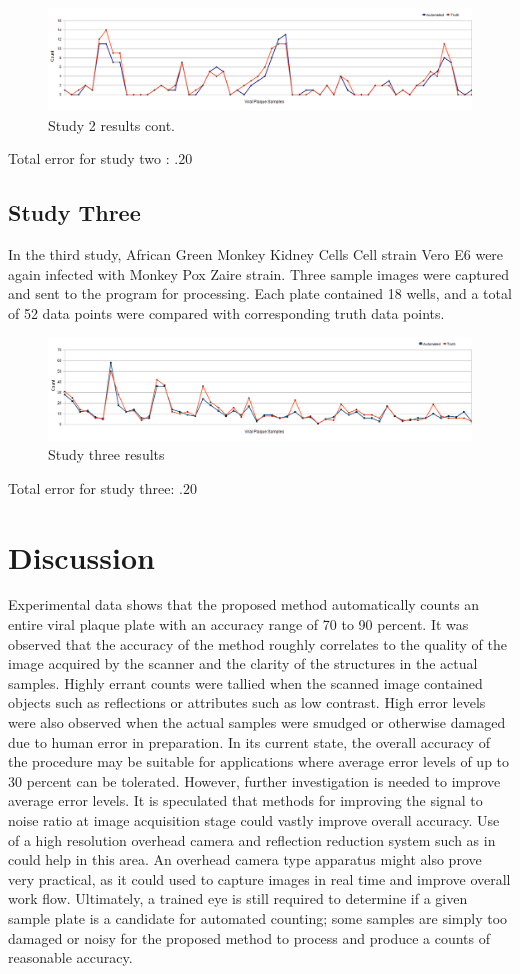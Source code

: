 \documentclass[11pt,final,twocolumn]{IEEEtran}
\begin{document}
\begin{figure}[H]
\centering
\includegraphics[width=.5\textwidth]{Study2ResultsCont.png}
\caption{Study 2 results cont.}
\label{fig:study2ResultsCont}
\end{figure}
Total error for study two : $.20$ 

\subsection{Study Three}
In the third study, African Green Monkey Kidney Cells  Cell strain Vero E6 were again infected with Monkey Pox Zaire strain. Three sample images were captured and sent to the program for processing. Each plate contained 18 wells, and a total of 52 data points were compared with corresponding truth data points.
\begin{figure}[H]
\centering
\includegraphics[width=.5\textwidth]{Study3Results.png}
\caption{Study three results}
\label{fig:study3Results}
\end{figure}
Total error for study three: $.20$ 


\section{Discussion}\label{sec:discussion}
Experimental data shows that the proposed method automatically counts an entire viral plaque plate with an accuracy range of 70 to 90 percent. It was observed that the accuracy of the method roughly correlates to the quality of the image acquired by the scanner and the clarity of the structures in the actual samples. Highly errant counts were tallied when the scanned image contained objects such as reflections or attributes such as low contrast. High error levels were also observed when the actual samples were smudged or otherwise damaged due to human error in preparation. In its current state, the overall accuracy of the procedure may be suitable for applications where average error levels of up to 30 percent can be tolerated. However, further investigation is needed to improve average error levels. It is speculated that methods for improving the signal to noise ratio at image acquisition stage could vastly improve overall accuracy. Use of a high resolution overhead camera and reflection reduction system such as in ~\cite{watershed} could help in this area. An overhead camera type apparatus might also prove very practical, as it could used to capture images in real time and improve overall work flow. Ultimately, a trained eye is still required to determine if a given sample plate is a candidate for automated counting; some samples are simply too damaged or noisy for the proposed method to process and produce a counts of reasonable accuracy.  
\end{document}
